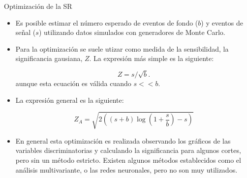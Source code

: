 \documentclass[center,10pt,cm]{beamer}
\begin{document}
\begin{frame}{Optimizaci\'on de la SR}

  \begin{itemize}\itemsep0.2cm
  \item Es posible estimar el n\'umero esperado de eventos de fondo ($b$) y eventos
    de se\~nal ($s$) utilizando datos simulados con generadores de Monte Carlo.

  \item Para la optimizaci\'on se suele utizar como medida de la sensibilidad, la
    significancia gausiana, $Z$. La expresi\'on m\'as simple es la siguiente:

    \begin{equation*}
      Z = s/\sqrt{b}.
    \end{equation*}
    aunque esta ecuaci\'on es v\'alida cuando $s << b$.

    \item La expresi\'on general es la siguiente:

    \begin{equation*}
      Z_A = \sqrt{2\left( (s + b) \log \left( 1 + \frac{s}{b} \right) - s \right)}
    \end{equation*}

  \item En general esta optimizaci\'on es realizada observando los gr\'aficos de las variables
    discriminatorias y calculando la significancia para algunos cortes, pero sin un
    m\'etodo estricto. Existen algunos m\'etodos establecidos como
    el an\'alisis multivariante, o las redes neuronales, pero no son muy utilizados.


  \end{itemize}

\end{frame}
\end{document}
